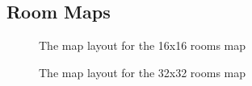 \documentclass[runningheads]{llncs}
\begin{document}
\subsection{Room Maps}
\begin{figure}[H]
\caption{The map layout for the 16x16 rooms map}
\end{figure}
\begin{figure}[H]
\caption{The map layout for the 32x32 rooms map}
\end{figure}
\end{document}
